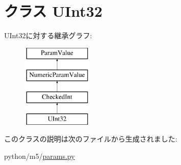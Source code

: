 \hypertarget{classm5_1_1params_1_1UInt32}{
\section{クラス UInt32}
\label{classm5_1_1params_1_1UInt32}
}
UInt32に対する継承グラフ:\begin{figure}[H]
\begin{center}
\leavevmode
\includegraphics[height=4cm]{classm5_1_1params_1_1UInt32}
\end{center}
\end{figure}


このクラスの説明は次のファイルから生成されました:\begin{DoxyCompactItemize}
\item 
python/m5/\hyperlink{params_8py}{params.py}\end{DoxyCompactItemize}
